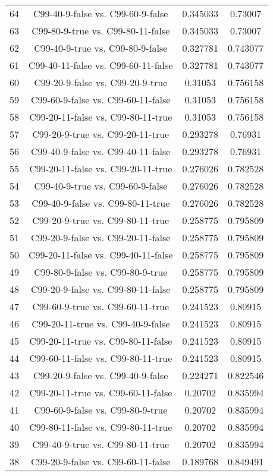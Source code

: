 \documentclass[a4paper,10pt]{article}
\begin{document}
\begin{landscape}
\begin{table}[!htp]
\begin{tabular}{cccc}
64&C99-40-9-false vs. C99-60-9-false&0.345033&0.73007\\
63&C99-80-9-true vs. C99-80-11-false&0.345033&0.73007\\
62&C99-40-9-true vs. C99-80-9-false&0.327781&0.743077\\
61&C99-40-11-false vs. C99-60-11-false&0.327781&0.743077\\
60&C99-20-9-false vs. C99-20-9-true&0.31053&0.756158\\
59&C99-60-9-false vs. C99-60-11-false&0.31053&0.756158\\
58&C99-20-11-false vs. C99-80-11-true&0.31053&0.756158\\
57&C99-20-9-true vs. C99-20-11-true&0.293278&0.76931\\
56&C99-40-9-false vs. C99-40-11-false&0.293278&0.76931\\
55&C99-20-11-false vs. C99-20-11-true&0.276026&0.782528\\
54&C99-40-9-true vs. C99-60-9-false&0.276026&0.782528\\
53&C99-40-9-false vs. C99-80-11-true&0.276026&0.782528\\
52&C99-20-9-true vs. C99-80-11-true&0.258775&0.795809\\
51&C99-20-9-false vs. C99-20-11-false&0.258775&0.795809\\
50&C99-20-11-false vs. C99-40-11-false&0.258775&0.795809\\
49&C99-80-9-false vs. C99-80-9-true&0.258775&0.795809\\
48&C99-20-9-false vs. C99-80-11-false&0.258775&0.795809\\
47&C99-60-9-true vs. C99-60-11-true&0.241523&0.80915\\
46&C99-20-11-true vs. C99-40-9-false&0.241523&0.80915\\
45&C99-20-11-true vs. C99-80-11-false&0.241523&0.80915\\
44&C99-60-11-false vs. C99-80-11-true&0.241523&0.80915\\
43&C99-20-9-false vs. C99-40-9-false&0.224271&0.822546\\
42&C99-20-11-true vs. C99-60-11-false&0.20702&0.835994\\
41&C99-60-9-false vs. C99-80-9-true&0.20702&0.835994\\
40&C99-80-11-false vs. C99-80-11-true&0.20702&0.835994\\
39&C99-40-9-true vs. C99-80-11-true&0.20702&0.835994\\
38&C99-20-9-false vs. C99-60-11-false&0.189768&0.849491\\

\end{tabular}
\end{table}
\end{landscape}
\end{document}

